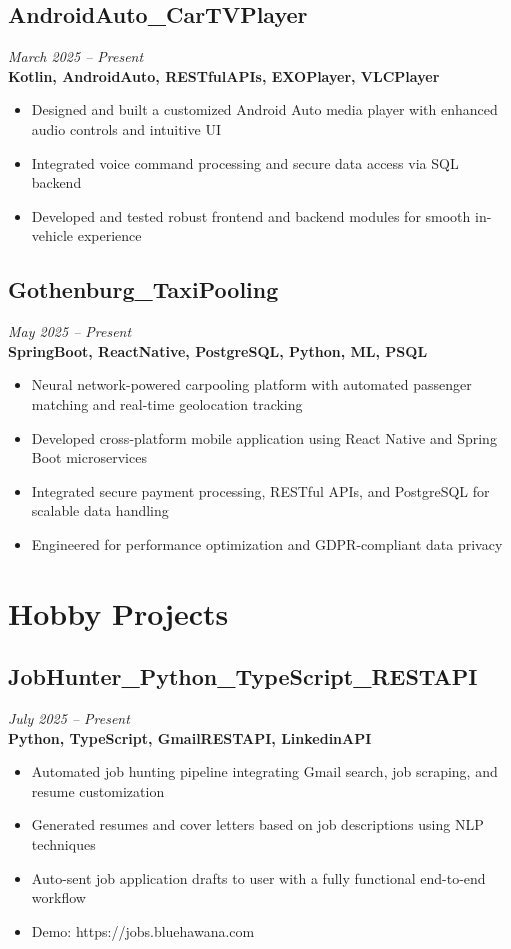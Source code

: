 \documentclass[11pt,a4paper]{article}
\begin{document}
\subsection{AndroidAuto\_CarTVPlayer}
\textit{March 2025 -- Present} \\
\textbf{Kotlin, AndroidAuto, RESTfulAPIs, EXOPlayer, VLCPlayer}
\begin{itemize}
\item Designed and built a customized Android Auto media player with enhanced audio controls and intuitive UI
\item Integrated voice command processing and secure data access via SQL backend
\item Developed and tested robust frontend and backend modules for smooth in-vehicle experience
\end{itemize}

\subsection{Gothenburg\_TaxiPooling}
\textit{May 2025 -- Present} \\
\textbf{SpringBoot, ReactNative, PostgreSQL, Python, ML, PSQL}
\begin{itemize}
\item Neural network-powered carpooling platform with automated passenger matching and real-time geolocation tracking
\item Developed cross-platform mobile application using React Native and Spring Boot microservices
\item Integrated secure payment processing, RESTful APIs, and PostgreSQL for scalable data handling
\item Engineered for performance optimization and GDPR-compliant data privacy
\end{itemize}

\section*{Hobby Projects}
\subsection{JobHunter\_Python\_TypeScript\_RESTAPI}
\textit{July 2025 -- Present} \\
\textbf{Python, TypeScript, GmailRESTAPI, LinkedinAPI}
\begin{itemize}
\item Automated job hunting pipeline integrating Gmail search, job scraping, and resume customization
\item Generated resumes and cover letters based on job descriptions using NLP techniques
\item Auto-sent job application drafts to user with a fully functional end-to-end workflow
\item Demo: https://jobs.bluehawana.com
\end{itemize}
\end{document}
